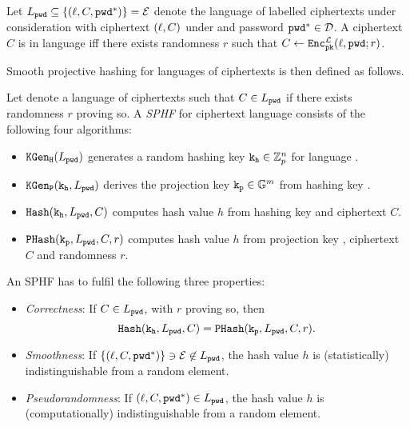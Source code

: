 
\begin{definition}\label{def:language}
Let $L_\mathtt{pwd} \subseteq \{(\ell, C, \mathtt{pwd}^\ast)\}=\mathcal{E}$ denote the language of labelled ciphertexts under consideration with ciphertext $(\ell,C)$ under \pk and password $\mathtt{pwd}^\ast\in\mathcal{D}$.
A ciphertext $C$ is in language \Lpwd iff there exists randomness $r$ such that $C\gets\mathtt{Enc}^{\mathcal{L}}_\mathtt{pk}(\ell,\mathtt{pwd};r)$.
\eod
\end{definition}

\noindent
Smooth projective hashing for languages of ciphertexts is then defined as follows.

\begin{definition}[KV-SPHF]\label{def:sphf}
Let \Lpwd denote a language of ciphertexts such that $C\in L_\mathtt{pwd}$ if there exists randomness $r$ proving so.
A \emph{\acl{SPHF}} for ciphertext language \Lpwd consists of the following four algorithms:

\begin{itemize}
	\item $\mathtt{KGen_H}(L_\mathtt{pwd})$ generates a random hashing key $\mathtt{k_h}\in\mathbb{Z}_p^n$ for language \Lpwd.
	\item $\mathtt{KGen_P}(\mathtt{k_h},L_\mathtt{pwd})$ derives the projection key $\mathtt{k_p}\in\mathbb{G}^m$ from hashing key \hk. 
	\item $\mathtt{Hash}(\mathtt{k_h},L_\mathtt{pwd},C)$ computes hash value $h$ from hashing key \hk and ciphertext $C$.
	\item $\mathtt{PHash}(\mathtt{k_p},L_\mathtt{pwd},C,r)$ computes hash value $h$ from projection key \hp, ciphertext $C$ and randomness $r$. \eod
\end{itemize}
\end{definition}

\noindent
An \ac{SPHF} has to fulfil the following three properties:
\begin{itemize}
	\item \emph{Correctness}: If $C\in L_\mathtt{pwd}$, with $r$ proving so, then \[\mathtt{Hash}(\mathtt{k_h},L_\mathtt{pwd},C)=\mathtt{PHash}(\mathtt{k_p},L_\mathtt{pwd},C,r).\]
	\item \emph{Smoothness}: If $\{(\ell, C, \mathtt{pwd}^\ast)\}\ni \mathcal{E}\not\in L_\mathtt{pwd}$, the hash value $h$ is (statistically) indistinguishable from a random element. 
	\item \emph{Pseudorandomness}: If $(\ell, C, \mathtt{pwd}^\ast)\in L_\mathtt{pwd}$, the hash value $h$ is (computationally) indistinguishable from a random element. 
\end{itemize}

